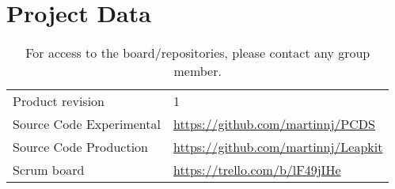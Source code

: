 \section{Project Data}

\begin{table}[h!]
    \begin{tabular}{l|l}
        Product revision         & 1 \\
        Source Code Experimental & \url{https://github.com/martinnj/PCDS}\\
        Source Code Production   & \url{https://github.com/martinnj/Leapkit}\\
        Scrum board              & \url{https://trello.com/b/lF49jIHe}
    \end{tabular}
    \label{tab:projdata}
    \caption{For access to the board/repositories, please contact any group member.}
\end{table}